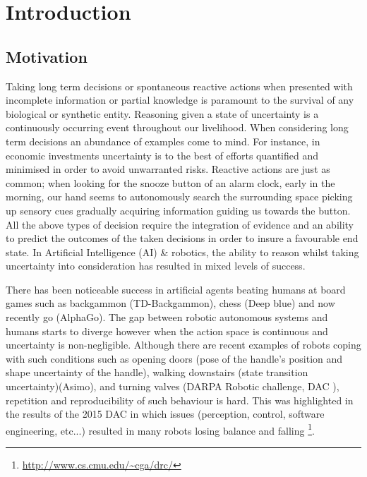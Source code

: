 \chapter{Introduction}

\section{Motivation}


Taking long term decisions or spontaneous reactive actions when presented with incomplete information or partial knowledge is 
paramount to the survival of any biological or synthetic entity. Reasoning given a state of uncertainty is a continuously occurring event throughout our 
livelihood. When considering long term decisions an abundance of examples come to mind. For instance, in economic investments 
uncertainty is to the best of efforts quantified and minimised in order to avoid unwarranted risks. Reactive actions are just as common; 
when looking for the snooze button of an alarm clock, early in the morning, our hand seems to autonomously search the surrounding space picking up
sensory cues gradually acquiring information guiding us towards the button. All the above types of decision require the integration of 
evidence and an ability to predict the outcomes of the taken decisions in order to insure a favourable end state. 
In Artificial Intelligence (AI) \& robotics, the ability to reason whilst taking uncertainty into consideration has resulted in mixed levels of success. 


There has been noticeable success in artificial agents beating humans at board games such as backgammon 
(TD-Backgammon), chess (Deep blue) and now recently go (AlphaGo). The gap between robotic autonomous systems and humans  starts to diverge however when the action space is continuous and 
uncertainty is non-negligible. Although there are recent examples of robots coping with such conditions such as opening doors (pose  of the handle's position and shape uncertainty of the handle),
walking downstairs (state transition uncertainty)(Asimo), and turning valves (DARPA Robotic challenge, DAC \cite{DARPA_2015}), 
repetition and reproducibility of such behaviour is hard. This was highlighted in the results of the 2015 DAC in which issues 
(perception, control, software engineering, etc...) resulted in many robots
losing balance and falling \footnote{\url{http://www.cs.cmu.edu/~cga/drc/}}. 

